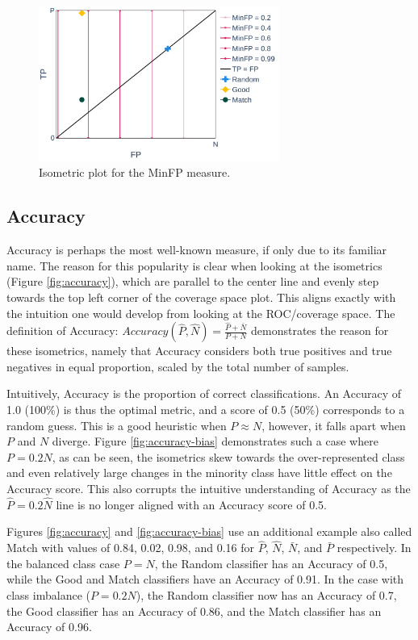 \begin{figure}[ht]
    \centering
    \includegraphics[width=0.7\textwidth]{Figures/MP-MinFP}
		\caption{Isometric plot for the MinFP measure.}
    \label{fig:minfp}
\end{figure}


\FloatBarrier
\subsection{Accuracy}

Accuracy is perhaps the most well-known measure, if only due to its familiar name. The reason for this popularity is clear when looking at the isometrics (Figure \ref{fig:accuracy}), which are parallel to the center line and evenly step towards the top left corner of the coverage space plot. This aligns exactly with the intuition one would develop from looking at the ROC/coverage space. The definition of Accuracy:
$Accuracy(\hat P, \hat N) = \frac{\hat P + \bar N}{P + N}$
demonstrates the reason for these isometrics, namely that Accuracy considers both true positives and true negatives in equal proportion, scaled by the total number of samples.

Intuitively, Accuracy is the proportion of correct classifications. An Accuracy of 1.0 (100\%) is thus the optimal metric, and a score of 0.5 (50\%) corresponds to a random guess. This is a good heuristic when $P \approx N$, however, it falls apart when $P$ and $N$ diverge. Figure \ref{fig:accuracy-bias} demonstrates such a case where $P = 0.2 N$, as can be seen, the isometrics skew towards the over-represented class and even relatively large changes in the minority class have little effect on the Accuracy score. This also corrupts the intuitive understanding of Accuracy as the $\hat P = 0.2 \hat N$ line is no longer aligned with an Accuracy score of 0.5. 

Figures \ref{fig:accuracy} and \ref{fig:accuracy-bias} use an additional example also called Match with values of 0.84, 0.02, 0.98, and 0.16 for $\hat P$, $\hat N$, $\bar N$, and $\bar P$ respectively. In the balanced class case $P=N$, the Random classifier has an Accuracy of 0.5, while the Good and Match classifiers have an Accuracy of 0.91. In the case with class imbalance ($P = 0.2 N$), the Random classifier now has an Accuracy of 0.7, the Good classifier has an Accuracy of 0.86, and the Match classifier has an Accuracy of 0.96.

